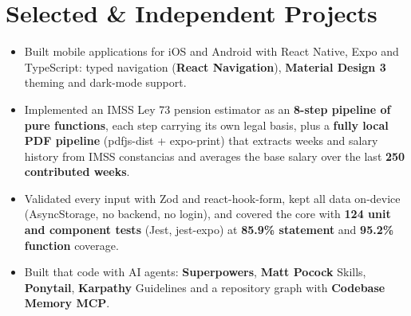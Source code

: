 {\section*{Selected \& Independent Projects}

\begin{itemize}
    \item Built mobile applications for iOS and Android with React Native, Expo and TypeScript: typed navigation (\textbf{React Navigation}), \textbf{Material Design 3} theming and dark-mode support.
    \item Implemented an IMSS Ley 73 pension estimator as an \textbf{8-step pipeline of pure functions}, each step carrying its own legal basis, plus a \textbf{fully local PDF pipeline} (pdfjs-dist + expo-print) that extracts weeks and salary history from IMSS constancias and averages the base salary over the last \textbf{250 contributed weeks}.
    \item Validated every input with Zod and react-hook-form, kept all data on-device (AsyncStorage, no backend, no login), and covered the core with \textbf{124 unit and component tests} (Jest, jest-expo) at \textbf{85.9\% statement} and \textbf{95.2\% function} coverage.
    \item Built that code with AI agents: \textbf{Superpowers}, \textbf{Matt Pocock} Skills, \textbf{Ponytail}, \textbf{Karpathy} Guidelines and a repository graph with \textbf{Codebase Memory MCP}.
\end{itemize}

}
